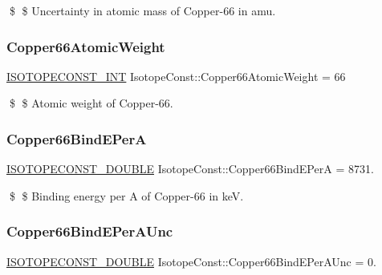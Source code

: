 \$ \$ Uncertainty in atomic mass of Copper-\/66 in amu. \mbox{\label{group___isotope_const-_copper-_cu66_ga08e873f2dd44265cad78634992d068a0}} 
\subsubsection{\texorpdfstring{Copper66\+Atomic\+Weight}{Copper66AtomicWeight}}
{\footnotesize\ttfamily \mbox{\hyperlink{group___isotope_const-_macros_ga5f18360b3e99483a35c32d789e62621c}{I\+S\+O\+T\+O\+P\+E\+C\+O\+N\+S\+T\+\_\+\+I\+NT}} Isotope\+Const\+::\+Copper66\+Atomic\+Weight = 66}

\$ \$ Atomic weight of Copper-\/66. \mbox{\label{group___isotope_const-_copper-_cu66_gabd20e99624f3aeeb57609b10a3df668b}} 
\subsubsection{\texorpdfstring{Copper66\+Bind\+E\+PerA}{Copper66BindEPerA}}
{\footnotesize\ttfamily \mbox{\hyperlink{group___isotope_const-_macros_ga8f45a7272ce02c0b4c65c44636ed719a}{I\+S\+O\+T\+O\+P\+E\+C\+O\+N\+S\+T\+\_\+\+D\+O\+U\+B\+LE}} Isotope\+Const\+::\+Copper66\+Bind\+E\+PerA = 8731.}

\$ \$ Binding energy per A of Copper-\/66 in keV. \mbox{\label{group___isotope_const-_copper-_cu66_ga19ae4745678895ecbe915cd13d78a9b0}} 
\subsubsection{\texorpdfstring{Copper66\+Bind\+E\+Per\+A\+Unc}{Copper66BindEPerAUnc}}
{\footnotesize\ttfamily \mbox{\hyperlink{group___isotope_const-_macros_ga8f45a7272ce02c0b4c65c44636ed719a}{I\+S\+O\+T\+O\+P\+E\+C\+O\+N\+S\+T\+\_\+\+D\+O\+U\+B\+LE}} Isotope\+Const\+::\+Copper66\+Bind\+E\+Per\+A\+Unc = 0.}

